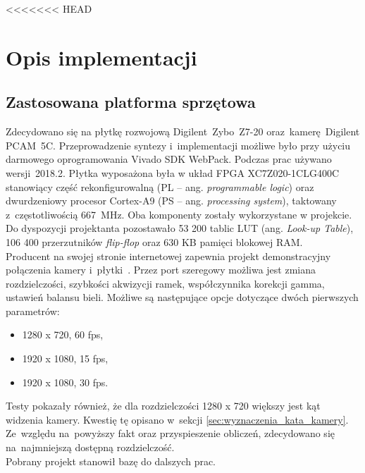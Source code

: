 <<<<<<< HEAD
\chapter{Opis implementacji}
\label{cha:Opis implementacji}
\section{Zastosowana platforma sprzętowa}
\label{sec:Zastosowana platforma sprzętowa}
Zdecydowano się na płytkę rozwojową Digilent~Zybo~Z7-20 oraz~kamerę~Digilent PCAM~5C. Przeprowadzenie syntezy i~implementacji możliwe było przy użyciu darmowego oprogramowania Vivado SDK WebPack. Podczas prac używano wersji~2018.2. Płytka wyposażona była w układ FPGA XC7Z020-1CLG400C stanowiący część rekonfigurowalną (PL -- ang. \textit{programmable logic}) oraz dwurdzeniowy procesor Cortex-A9 (PS -- ang. \textit{processing system}), taktowany z~częstotliwością 667~MHz. Oba komponenty zostały wykorzystane w projekcie. Do dyspozycji projektanta pozostawało 53 200 tablic LUT (ang. \textit{Look-up Table}), 106 400 przerzutników \textit{flip-flop} oraz 630 KB pamięci blokowej RAM. \\
Producent na swojej stronie internetowej zapewnia projekt demonstracyjny połączenia kamery i~płytki~\cite{projektPCAM}. Przez port szeregowy możliwa jest zmiana rozdzielczości, szybkości akwizycji ramek, współczynnika korekcji gamma, ustawień balansu bieli. Możliwe są następujące opcje dotyczące dwóch pierwszych parametrów:
\begin{itemize}
	\item 1280 x 720, 60 fps,
	\item 1920 x 1080, 15 fps,
	\item 1920 x 1080, 30 fps.
\end{itemize}
Testy pokazały również, że dla rozdzielczości 1280 x 720 większy jest kąt widzenia kamery. Kwestię tę opisano w~sekcji \ref{sec:wyznaczenia_kata_kamery}. Ze~względu na~powyższy fakt oraz przyspieszenie obliczeń, zdecydowano się na~najmniejszą dostępną rozdzielczość.\\
Pobrany projekt stanowił bazę do dalszych prac. 
